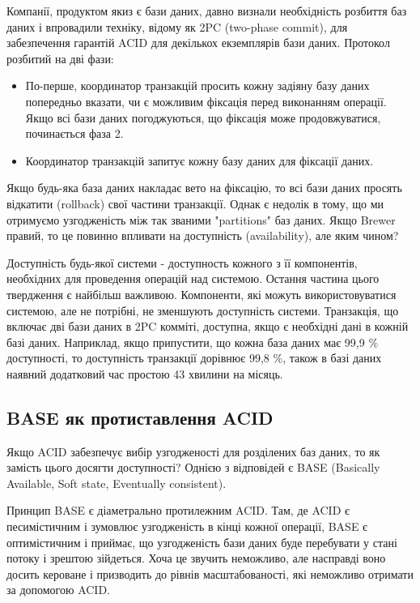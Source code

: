 \documentclass[14pt]{vakthesis}
\begin{document}
Компанії, продуктом якиз є бази даних, давно визнали необхідність розбиття баз даних і впровадили техніку, відому як 2PC (two-phase commit), для забезпечення гарантій ACID для декількох екземплярів бази даних. Протокол розбитий на дві фази:
\begin{itemize}
\item По-перше, координатор транзакцій просить кожну задіяну базу даних попередньо вказати, чи є можливим фіксація перед виконанням операції. 
Якщо всі бази даних погоджуються, що фіксація може продовжуватися, починається фаза 2.
\item Координатор транзакцій запитує кожну базу даних для фіксації даних.
\end{itemize}

Якщо будь-яка база даних накладає вето на фіксацію, то всі бази даних просять відкатити (rollback) свої частини транзакції. Однак є недолік в тому, що ми отримуємо узгодженість між так званими "partitions" баз даних. Якщо Brewer правий, то це повинно впливати на доступність (availability), але яким чином?

Доступність будь-якої системи - доступность кожного з її компонентів, необхідних для проведення операцій над системою. 
Остання частина цього твердження є найбільш важливою. Компоненти, які можуть використовуватися системою, але не потрібні, не зменшують доступність системи. Транзакція, що включає дві бази даних в 2PC комміті, доступна, якщо є необхідні дані в кожній базі даних. 
Наприклад, якщо припустити, що кожна база даних має 99,9 \% доступності, то доступність транзакції дорівнює 99,8 \%, також в базі даних наявний додатковий час простою 43 хвилини на місяць.

\subsection{BASE як протиставлення ACID} 

Якщо ACID забезпечує вибір узгодженості для розділених баз даних, то як замість цього досягти доступності? 
Однією з відповідей є BASE (Basically Available, Soft state, Eventually consistent).

Принцип BASE є діаметрально протилежним ACID. Там, де ACID є песимістичним і зумовлює узгодженість в кінці кожної операції, BASE є оптимістичним і приймає, що узгодженість бази даних буде перебувати у стані потоку і зрештою зійдеться. 
Хоча це звучить неможливо, але насправді воно досить кероване і призводить до рівнів масштабованості, які неможливо отримати за допомогою ACID.
\end{document}

